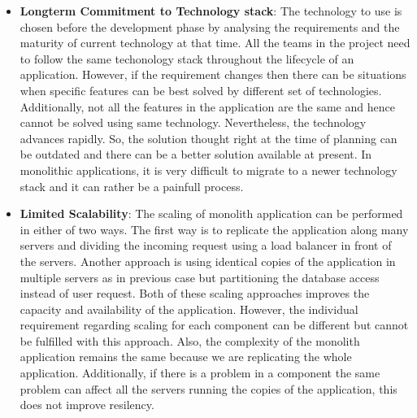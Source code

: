 \begin{itemize}[leftmargin=.5in]
\\
\item \textbf{Longterm Commitment to Technology stack}: The technology to use is chosen before the development phase by analysing the requirements and the maturity of current technology at that time. All the teams in the project need to follow the same techonology stack throughout the lifecycle of an application. However, if the requirement changes then there can be situations when specific features can be best solved by different set of technologies. Additionally, not all the features in the application are the same and hence cannot be solved using same technology. Nevertheless, the technology advances rapidly. So, the solution thought right at the time of planning can be outdated and there can be a better solution available at present. In monolithic applications, it is very difficult to migrate to a newer technology stack and it can rather be a painfull process.
\\
\item \textbf{Limited Scalability}: The scaling of monolith application can be performed in either of two ways. The first way is to replicate the application along many servers and dividing the incoming request using a load balancer in front of the servers. Another approach is using identical copies of the application in multiple servers as in previous case but partitioning the database access instead of user request. Both of these scaling approaches improves the capacity and availability of the application. However, the individual requirement regarding scaling for each component can be different but cannot be fulfilled with this approach. Also, the complexity of the monolith application remains the same because we are replicating the whole application. Additionally, if there is a problem in a component the same problem can affect all the servers running the copies of the application, this does not improve resilency.\cite{MacVittie:2014aa}\cite{Namiot:2014aa}
\end{itemize}
\\

